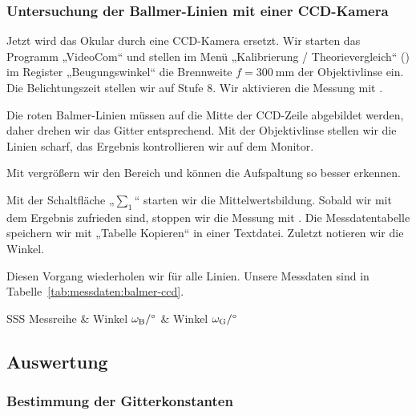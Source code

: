 \FloatBarrier
\subsubsection{Untersuchung der Ballmer-Linien mit einer CCD-Kamera}

Jetzt wird das Okular durch eine CCD-Kamera ersetzt. Wir starten das Programm
„VideoCom“ und stellen im Menü „Kalibrierung / Theorievergleich“
() im Register „Beugungswinkel“ die Brennweite $f =
\SI{300}{\milli\meter}$ der Objektivlinse ein. Die Belichtungszeit stellen wir
auf Stufe 8. Wir aktivieren die Messung mit .

Die roten Balmer-Linien müssen auf die Mitte der CCD-Zeile abgebildet werden,
daher drehen wir das Gitter entsprechend. Mit der Objektivlinse stellen wir die
Linien scharf, das Ergebnis kontrollieren wir auf dem Monitor.

Mit \Alt{} vergrößern wir den Bereich und können die Aufspaltung so
besser erkennen.

Mit der Schaltfläche „$\sum_1$“ starten wir die Mittelwertsbildung. Sobald wir
mit dem Ergebnis zufrieden sind, stoppen wir die Messung mit .
Die Messdatentabelle speichern wir mit „Tabelle Kopieren“ in einer Textdatei.
Zuletzt notieren wir die Winkel.

Diesen Vorgang wiederholen wir für alle Linien. Unsere Messdaten sind in
Tabelle~\ref{tab:messdaten:balmer-ccd}.

\begin{table}[htbp]
    \centering
    \begin{tabular}{SSS}
        {Messreihe} & {Winkel $\omegaB / \si\degree$}  & {Winkel $\omegaG /
    \si\degree$} \\
        \hline
    \end{tabular}
    \caption{%
        Messdaten für die Ballmer-Lampe, bestimmt mit einer CCD-Zeile.
    }
    \label{tab:messdaten:balmer-ccd}
\end{table}

\FloatBarrier
\subsection{Auswertung}

\FloatBarrier
\subsubsection{Bestimmung der Gitterkonstanten}

